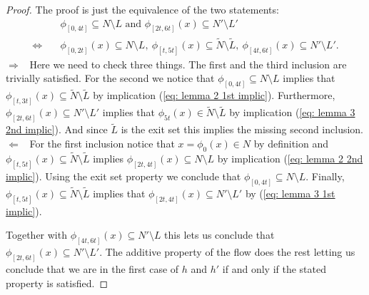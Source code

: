 \begin{proof}
The proof is just the equivalence of the two statements:
\begin{align*}
& \phi_{[0,4t]}\subseteq N\setminus L \text{ and } \phi_{[2t,6t]}(x)\subseteq N'\setminus L' \\
\Leftrightarrow \quad & \phi_{[0,2t]}(x)\subseteq N\setminus L,~ \phi_{[t,5t]}(x)\subseteq \tilde{N}\setminus \tilde{L},~\phi_{[4t,6t]}(x)\subseteq N' \setminus L'.
\end{align*}
\newline \glqq $\Rightarrow$\grqq~ Here we need to check three things. The first and the third inclusion are trivially satisfied. For the second we notice that $\phi_{[0,4t]}\subseteq N\setminus L$ implies that $\phi_{[t,3t]}(x)\subseteq \tilde{N} \setminus \tilde{L}$ by implication (\ref{eq: lemma 2 1st implic}). Furthermore, $\phi_{[2t,6t]}(x)\subseteq N'\setminus L'$ implies that $\phi_{5t}(x)\in \tilde{N}\setminus \tilde{L}$ by implication (\ref{eq: lemma 3 2nd implic}). And since $\tilde{L}$ is the exit set this implies the missing second inclusion.
\newline \glqq $\Leftarrow$\grqq~ For the first inclusion notice that $x=\phi_0(x)\in N$ by definition and $\phi_{[t,5t]}(x)\subseteq \tilde{N}\setminus \tilde{L}$ implies $\phi_{[2t,4t]}(x)\subseteq N \setminus L$ by implication (\ref{eq: lemma 2 2nd implic}). Using the exit set property we conclude that $\phi_{[0,4t]}\subseteq N\setminus L$. Finally, $\phi_{[t,5t]}(x)\subseteq \tilde{N}\setminus \tilde{L}$ implies that $\phi_{[2t,4t]}(x)\subseteq N' \setminus L'$ by (\ref{eq: lemma 3 1st implic}).

Together with $\phi_{[4t,6t]}(x)\subseteq N' \setminus L$ this lets us conclude that $ \phi_{[2t,6t]}(x)\subseteq N'\setminus L'$. The additive property of the flow does the rest letting us conclude that we are in the first case of $h$ and $h'$ if and only if the stated property is satisfied.  
\end{proof}


